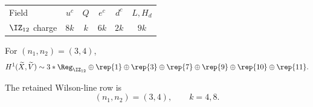 
\begin{tabular}{| l | c | c | c |c | c |}
Field  & $u^c$  & $Q$  & $e^c$  & $d^c$  & $L, H_d$ \\
$\IZ_{12}$ charge  & $8k$  & $k$  & $6k$  & $2k$  & $9k$ \\
\end{tabular}

For $(n_1,n_2)=(3,4)$,
\begin{equation*}
H^1(\widetilde X,\widetilde V) \sim 3*\Reg_{\IZ_{12}}\oplus
\rep{1}\oplus\rep{3}\oplus\rep{7}\oplus\rep{9}\oplus\rep{10}\oplus\rep{11}.
\end{equation*}

The retained Wilson-line row is
\begin{equation*}
(n_1,n_2)=(3,4),\qquad k=4,8.
\end{equation*}
